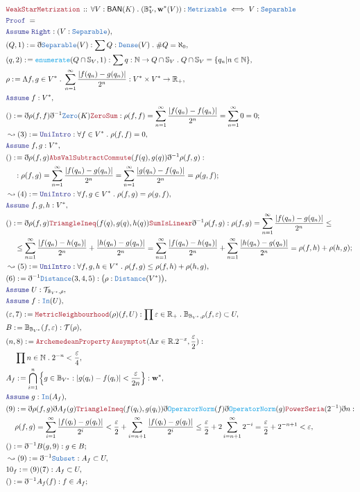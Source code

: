 \documentclass[12pt]{scrartcl}
\newcommand{\TYPE}[1]{\textcolor{NavyBlue}{\mathtt{#1}}}
\newcommand{\FUNC}[1]{\textcolor{Cerulean}{\mathtt{#1}}}
\newcommand{\LOGIC}[1]{\textcolor{Blue}{\mathtt{#1}}}
\newcommand{\THM}[1]{\textcolor{Maroon}{\mathtt{#1}}}
\renewcommand{\.}{\; . \;}
\newcommand{\de}{: \kern 0.1pc =}
\newcommand{\Theorem}[2]{& \THM{#1} \, :: \, #2 \\ & \Proof = \\ }
\newcommand{\NewLine}{\\ & \kern 1pc}
\newcommand{\Page}[1]{\begin{align*} #1 \end{align*} \newpage   }
\newcommand{ \bd }{ \ByDef }
\newcommand{\Reals}{\mathbb{R} }
\newcommand{\Nat}{\mathbb{N} }
\newcommand{\Say}[3]{& #1 \de #2 : #3, \\}
\newcommand{\Conclude}[3]{& #1 \de #2 : #3; \\}
\newcommand{\Derive}[3]{& \leadsto #1 \de #2 : #3, \\}
\newcommand{\A}{\LOGIC{Assume} \;}
\newcommand{\Assume}[2]{& \A #1 : #2, \\}
\newcommand{\ByDef}{\eth}
\newcommand{\Proof}{\LOGIC{Proof} \; }
\newcommand{\BAN}{\textsf{BAN}}
\begin{document}
\Page{ 
\Theorem{WeakStarMetrization}{ \forall V : \BAN(K) \. (\mathbb{B}_V^*,\mathbf{w}^*(V)) : \TYPE{Metrizable} \iff V : \TYPE{Separable}}
\Assume{\LOGIC{Right}}{(V : \TYPE{Separable})}
\Say{(Q,1)}{\bd \TYPE{Separable}(V)}{ \sum Q : \TYPE{Dense}(V) \. \# Q = \aleph_0}
\Say{(q,2)}{\FUNC{enumerate}(Q \cap \mathbb{S}_V,1)}{ \sum q : \Nat \to Q \cap \mathbb{S}_V \. Q \cap \mathbb{S}_V = \{ q_n | n \in \Nat \}  }
\Say{\rho}{ \Lambda f,g \in V^* \. \sum^\infty_{n = 1} \frac{| f(q_n) - g(q_n)|}{2^n}}{V^* \times V^* \to \Reals_+}
\Assume{f}{V^*}
\Conclude{()}{ \bd \rho(f,f) \bd^{-1} \TYPE{Zero}(K) \THM{ZeroSum} }{\rho(f,f) = \sum^\infty_{n = 1} \frac{| f(q_n) - f(q_n)|}{2^n} = \sum^\infty_{n = 1} 0 = 0  }
\Derive{(3)}{\LOGIC{UniIntro}}{ \forall f \in V^* \. \rho(f,f) = 0 }
\Assume{f,g}{V^*}
\Conclude{()}{\bd \rho (f,g) \THM{AbsValSubtractCommute}(f(q),g(q)) \bd^{-1} \rho (f,g)}
{ 
 \NewLine :
\rho(f,g) = \sum^\infty_{n = 1} \frac{| f(q_n) - g(q_n)|}{2^n} = 
\sum^\infty_{n = 1} \frac{| g(q_n) - f(q_n)|}{2^n} = \rho(g,f)
}
\Derive{(4)}{\LOGIC{UniIntro}}{ \forall f,g \in V^* \. \rho(f,g) = \rho(g,f) }
\Assume{f,g,h}{V^*}
\Conclude{()}{\bd \rho (f,g) \THM{TriangleIneq}(f(q),g(q),h(q)) \THM{SumIsLinear} \bd^{-1} \rho (f,g)}
{
\rho(f,g) = \sum^\infty_{n = 1} \frac{| f(q_n) - g(q_n)|}{2^n}  \le  
 \NewLine \le 
\sum^\infty_{n = 1} \frac{| f(q_n) - h(q_n)|}{2^n} +  \frac{| h(q_n) - g(q_n)|}{2^n}   = 
\sum^\infty_{n = 1} \frac{| f(q_n) - h(q_n)|}{2^n} +  \sum^\infty_{n = 1} \frac{| h(q_n) - g(q_n)|}{2^n} 
= \rho(f,h) + \rho(h,g)
}
\Derive{(5)}{\LOGIC{UniIntro}}{ \forall f,g,h \in V^* \. \rho(f,g) \le \rho(f,h) + \rho(h,g) }
\Say{(6)}{\bd^{-1} \TYPE{Distance}(3,4,5)}{ \big(\rho : \TYPE{Distance}(V^*) \big)}
\Assume{U}{\mathcal{T}_{\mathbb{B}_{V^*}, \rho}}
\Assume{f}{\TYPE{In}(U)}
\Say{(\varepsilon,7)}{\THM{MetricNeighbourhood}(\rho)(f, U)}{\prod \varepsilon \in \Reals_+ \. \mathbb{B}_{\mathbb{B}_{V^*},\rho}( f, \varepsilon )  \subset U }
\Say{B}{ \mathbb{B}_{\mathbb{B}_{V^*}}(f, \varepsilon)}{\mathcal{T}(\rho)}
\Say{(n,8)}{\THM{ArchemedeanProperty}\, \THM{Assymptot}(\Lambda x \in \Reals. 2^{-x},\frac{\varepsilon}{2})}{\NewLine  \prod n \in \Nat \. 2^{-n} < \frac{\varepsilon}{4} }
\Say{A_f}{ \bigcap^n_{i = 1}\left\{ g \in \mathbb{B}_{V^*} : | g(q_i) - f(q_i)  | < \frac{\varepsilon}{2n}  \right\}}{ \mathbf{w}^*  }
\Assume{g}{\TYPE{In}(A_f)}
\Say{(9) }{ \bd\rho(f,g)\bd A_f(g) \THM{TriangleIneq}( f(q_i),g(q_i)) \bd \FUNC{OperarorNorm}(f) \bd \FUNC{OperatorNorm}(g) 
\THM{PowerSeria}(2^{-1}) \bd n   }
{ \NewLine \rho(f,g) = \sum^\infty_{i = 1} \frac{|f(q_i) - g(q_i)  |}{2^i} < \frac{\varepsilon}{2} + \sum^\infty_{i = n + 1}  \frac{|f(q_i) - g(q_i)  |}{2^i}  
 \le  \frac{\varepsilon}{2}   +  2\sum^\infty_{i = n + 1} 2^{-i} = \frac{\varepsilon}{2}   + 2^{-n + 1}  < \varepsilon  
}
\Conclude{()}{ \bd^{-1} B(g,9)  }{ g \in B}
\Derive{(9)}{ \bd^{-1} \TYPE{Subset}  }{ A_f \subset U }
\Say{ 10_f}{ (9)(7) }{A_f \subset U}
\Conclude{()}{\bd^{-1} A_f(f)}{f \in A_f}
}
\end{document}
